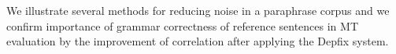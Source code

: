 We illustrate several methods for reducing noise in a paraphrase corpus and
we confirm importance of grammar correctness of reference sentences in MT 
evaluation by the improvement of correlation after applying the Depfix system. 


